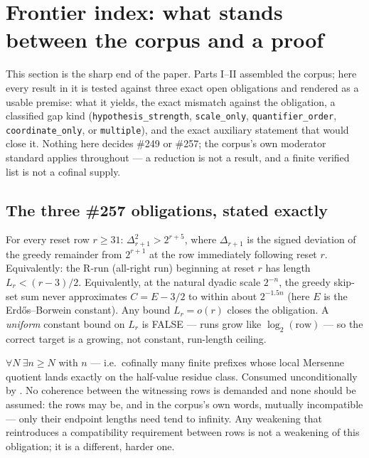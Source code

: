 \section{Frontier index: what stands between the corpus and a proof}

This section is the sharp end of the paper. Parts I--II assembled the corpus; here every
result in it is tested against three exact open obligations and rendered as a usable premise:
what it yields, the exact mismatch against the obligation, a classified gap kind
(\texttt{hypothesis\_strength}, \texttt{scale\_only}, \texttt{quantifier\_order},
\texttt{coordinate\_only}, or \texttt{multiple}), and the exact auxiliary statement that would
close it. Nothing here decides \#249 or \#257; the corpus's own moderator standard applies
throughout — a reduction is not a result, and a finite verified list is not a cofinal supply.

\subsection{The three \#257 obligations, stated exactly}

\begin{defn}[257-reset]
For every reset row $r \ge 31$: $\Delta_{r+1}^2 > 2^{r+5}$, where $\Delta_{r+1}$ is the signed
deviation of the greedy remainder from $2^{r+1}$ at the row immediately following reset $r$.
Equivalently: the R-run (all-right run) beginning at reset $r$ has length $L_r < (r-3)/2$.
Equivalently, at the natural dyadic scale $2^{-n}$, the greedy skip-set sum never approximates
$C = E - 3/2$ to within about $2^{-1.5n}$ (here $E$ is the Erdős--Borwein constant). Any bound
$L_r = o(r)$ closes the obligation. A \emph{uniform} constant bound on $L_r$ is FALSE — runs
grow like $\log_2(\mathrm{row})$ — so the correct target is a growing, not constant, run-length
ceiling.
\end{defn}

\begin{defn}
$\forall N\ \exists n \ge N$ with  $n$
— i.e.\ cofinally many finite prefixes whose local Mersenne quotient lands exactly on the
half-value residue class. Consumed unconditionally by
.
No coherence between the witnessing rows is demanded and none should be assumed: the rows may
be, and in the corpus's own words, mutually incompatible — only their endpoint lengths need
tend to infinity. Any weakening that reintroduces a compatibility requirement between rows is
not a weakening of this obligation; it is a different, harder one.
\end{defn}

